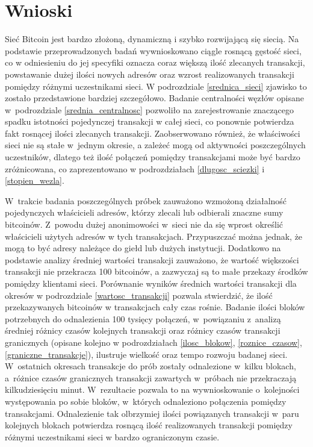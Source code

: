 \documentclass[12pt, twoside, final, openany]{mgr}
\begin{document}
\section{Wnioski}

Sieć Bitcoin jest bardzo złożoną, dynamiczną i szybko rozwijającą się siecią. Na podstawie przeprowadzonych badań wywnioskowano ciągle rosnącą gęstość sieci, co w odniesieniu do jej specyfiki oznacza coraz większą ilość zlecanych transakcji, powstawanie dużej ilości nowych adresów oraz wzrost realizowanych transakcji pomiędzy różnymi uczestnikami sieci. W podrozdziale \ref{srednica_sieci} zjawisko to zostało przedstawione bardziej szczegółowo. Badanie centralności węzłów opisane w~podrozdziale \ref{srednia_centralnosc} pozwoliło na zarejestrowanie znaczącego spadku istotności pojedynczej transakcji w całej sieci, co ponownie potwierdza fakt rosnącej ilości zlecanych transakcji. Zaobserwowano również, że właściwości sieci nie są stałe w~jednym okresie, a zależeć mogą od aktywności poszczególnych uczestników, dlatego też ilość połączeń pomiędzy transakcjami może być bardzo zróżnicowana, co zaprezentowano w podrozdziałach \ref{dlugosc_sciezki} i \ref{stopien_wezla}. 

\indent W~trakcie badania poszczególnych próbek zauważono wzmożoną działalność pojedynczych właścicieli adresów, którzy zlecali lub odbierali znaczne sumy bitcoinów. Z~powodu dużej anonimowości w~sieci nie da się wprost określić właścicieli użytych adresów w tych transakcjach. Przypuszczać można jednak, że mogą to być adresy należące do giełd lub dużych instytucji. Dodatkowo na podstawie analizy średniej wartości transakcji zauważono, że wartość większości transakcji nie przekracza 100 bitcoinów, a zazwyczaj są to małe przekazy środków pomiędzy klientami sieci. Porównanie wyników średnich wartości transakcji dla okresów w podrozdziale \ref{wartosc_transakcji} pozwala stwierdzić, że ilość przekazywanych bitcoinów w transakcjach cały czas rośnie. Badanie ilości bloków potrzebnych do odnalezienia 100 tysięcy połączeń, w~powiązaniu z~analizą średniej różnicy czasów kolejnych transakcji oraz różnicy czasów transakcji granicznych (opisane kolejno w podrozdziałach \ref{ilosc_blokow}, \ref{roznice_czasow}, \ref{graniczne_transakcje}), ilustruje wielkość oraz tempo rozwoju badanej sieci. W~ostatnich okresach transakcje do prób zostały odnalezione w~kilku blokach, a~różnice czasów granicznych transakcji zawartych w~próbach nie przekraczają kilkudziesięciu minut. W~rezultacie pozwala to na wywnioskowanie o~kolejności występowania po sobie bloków, w~których odnaleziono połączenia pomiędzy transakcjami. Odnalezienie tak olbrzymiej ilości powiązanych transakcji w~paru kolejnych blokach potwierdza rosnącą ilość realizowanych transakcji pomiędzy różnymi uczestnikami sieci w bardzo ograniczonym czasie.
\end{document}
